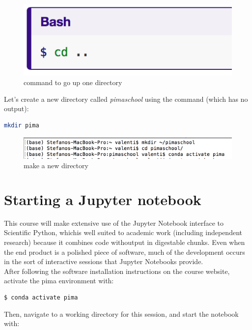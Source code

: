 \documentclass[11pt]{book}
\begin{document}
\begin{figure}[!]
\includegraphics[scale=.6]{figures/cdback.png}
\caption{command to go up one directory}
\end{figure}


Let’s create a new directory called \emph{pimaschool} using the command (which has no output):
\begin{lstlisting}[language=bash]
mkdir pima 
\end{lstlisting}

\begin{figure}[!]
\includegraphics[scale=.6]{figures/mkdirpima.png}
\caption{make a new directory}
\end{figure}



\newpage

\section{Starting a Jupyter notebook}
This course will make extensive use of the Jupyter Notebook interface to Scientific Python, whichis  well  suited  to  academic  work  (including  independent  research)  because  it  combines  code  withoutput in digestable chunks.  Even when the end product is a polished piece of software, much of the development occurs in the sort of interactive sessions that Jupyter Notebooks provide.\\

After following the software installation instructions on the course website, activate the pima environment with:

\begin{lstlisting}[language=bash]
  $ conda activate pima
\end{lstlisting}

Then, navigate to a working directory for this session, and start the notebook with:
\end{document}
